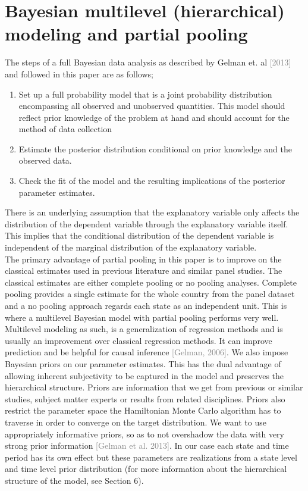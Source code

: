 \documentclass{article}
\begin{document}
\section{Bayesian multilevel (hierarchical) modeling and partial pooling}
The steps of a full Bayesian data analysis as described by  Gelman et. al \textcolor{gray}{[2013]} and followed in this paper are as follows;
\begin{enumerate}
\item{Set up a full probability model that is a joint probability distribution encompassing all observed and unobserved quantities. This model should reflect prior knowledge of the problem at hand and should account for the method of data collection}
\item{Estimate the posterior distribution conditional on prior knowledge and the observed data.}
\item{Check the fit of the model and the resulting implications of the posterior parameter estimates.}
\end{enumerate}
There is an underlying assumption that the explanatory variable only affects the distribution of the dependent variable through the explanatory variable itself. This implies that the conditional distribution of the dependent variable is independent of the marginal distribution of the explanatory variable.\\
The primary advantage of partial pooling in this paper is to improve on the classical estimates used in previous literature and similar panel studies. The classical estimates are either complete pooling or no pooling analyses. Complete pooling provides a single estimate for the whole country from the panel dataset and a no pooling approach regards each state as an independent unit. This is where a multilevel Bayesian model with partial pooling performs very well.  Multilevel modeling as such, is a generalization of regression methods and is usually an improvement over classical regression methods. It can improve prediction and be helpful for causal inference  \textcolor{gray}{[Gelman, 2006]}.
We also impose Bayesian priors on our parameter estimates. This has the dual advantage of allowing inherent subjectivity to be captured in the model and preserves the hierarchical structure. Priors are information that we get from previous or similar studies, subject matter experts or results from related disciplines. Priors also restrict the parameter space the Hamiltonian Monte Carlo algorithm has to traverse in order to converge on the target distribution. We want to use appropriately informative priors,  so as to not overshadow the data with very strong prior information \textcolor{gray}{[Gelman et al. 2013]}.  In our case each state and time period has its own effect but these parameters are realizations from a state level and time level prior distribution (for more information about the hierarchical structure of the model, see Section 6).
\end{document}
